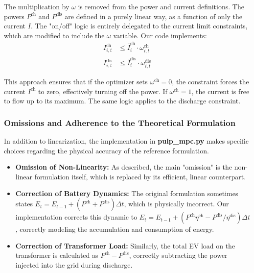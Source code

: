 The multiplication by $\omega$ is removed from the power and current definitions. The powers $P^{\text{ch}}$ and $P^{\text{dis}}$ are defined in a purely linear way, as a function of only the current $I$.
The "on/off" logic is entirely delegated to the current limit constraints, which are modified to include the $\omega$ variable. Our code implements:
\begin{subequations}
\begin{align}
    I^{\text{ch}}_{i,t} &\le \bar{I}^{\text{ch}}_{i} \cdot \omega^{\text{ch}}_{i,t} \\
    I^{\text{dis}}_{i,t} &\le \bar{I}^{\text{dis}}_{i} \cdot \omega^{\text{dis}}_{i,t}
\end{align}
\end{subequations}

This approach ensures that if the optimizer sets $\omega^{\text{ch}}=0$, the constraint forces the current $I^{\text{ch}}$ to zero, effectively turning off the power. If $\omega^{\text{ch}}=1$, the current is free to flow up to its maximum. The same logic applies to the discharge constraint.

\subsubsection{Omissions and Adherence to the Theoretical Formulation}

In addition to linearization, the implementation in \textbf{pulp\_mpc.py} makes specific choices regarding the physical accuracy of the reference formulation.

\begin{itemize}
    \item \textbf{Omission of Non-Linearity:} As described, the main "omission" is the non-linear formulation itself, which is replaced by its efficient, linear counterpart.
    \item \textbf{Correction of Battery Dynamics:} The original formulation sometimes states $E_{t} = E_{t-1} + (P^{\text{ch}} + P^{\text{dis}})\Delta t$, which is physically incorrect. Our implementation corrects this dynamic to $E_{t} = E_{t-1} + (P^{\text{ch}}\eta^{\text{ch}} - P^{\text{dis}}/\eta^{\text{dis}})\Delta t$, correctly modeling the accumulation and consumption of energy.
    \item \textbf{Correction of Transformer Load:} Similarly, the total EV load on the transformer is calculated as $P^{\text{ch}} - P^{\text{dis}}$, correctly subtracting the power injected into the grid during discharge.

\end{itemize}

